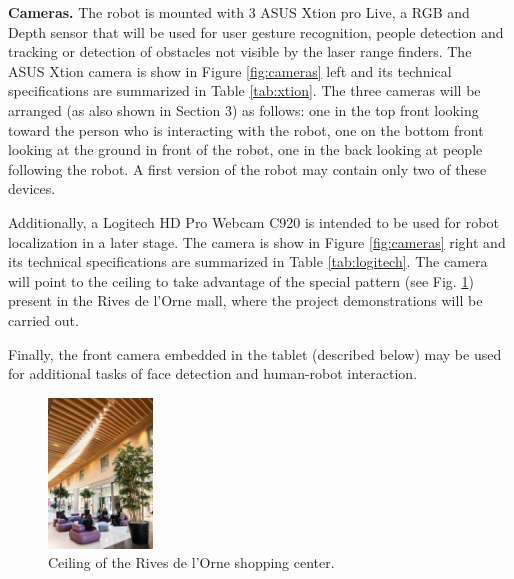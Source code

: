 {\bf Cameras.} The robot is mounted with 3 ASUS Xtion pro Live, a RGB
and Depth sensor that will be used for user gesture recognition,
people detection and tracking or detection of obstacles not visible by
the laser range finders. 
The ASUS Xtion camera is show in Figure \ref{fig:cameras} left and its technical specifications are summarized in Table \ref{tab:xtion}.
The three cameras will be arranged (as also shown in Section 3) as follows:
one in the top front looking toward the person who is interacting with the robot,
one on the bottom front looking at the ground in front of the robot, one in the back looking at people following the robot.
A first version of the robot may contain only two of these devices.

Additionally, a Logitech HD Pro Webcam C920 is intended to be used for
robot localization in a later stage.
The camera is show in Figure \ref{fig:cameras} right and its technical specifications are summarized in Table \ref{tab:logitech}.
The camera will point to the ceiling
to take advantage of the special pattern (see Fig. \ref{fig:ceiling}) present in
the Rives de l'Orne mall, where the project demonstrations will be
carried out.

Finally, the front camera embedded in the tablet (described below) may be used for additional tasks of face detection and human-robot interaction.

\begin{figure}[h!]
\begin{center}
\includegraphics[height=4cm]{fig/ceiling.jpg}
\end{center}
\caption{Ceiling of the Rives de l'Orne shopping center.}
\label{fig:ceiling}
\end{figure}

